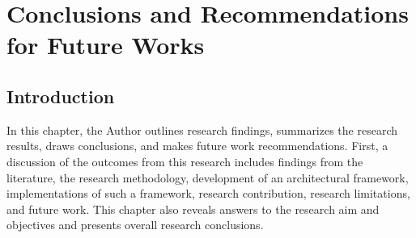 \chapter{Conclusions and Recommendations for Future Works}
\section{Introduction}
In this chapter, the Author outlines research findings, summarizes the research results, draws conclusions, and makes future work recommendations. First, a discussion of the outcomes from this research includes findings from the literature, the research methodology, development of an architectural framework, implementations of such a framework, research contribution, research limitations, and future work. This chapter also reveals answers to the research aim and objectives and presents overall research conclusions.
